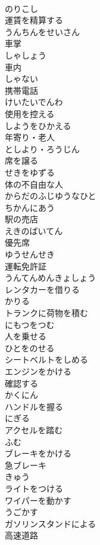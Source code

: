 \documentclass[8pt]{extreport}
\begin{document}
\begin{CJK}{UTF8}{min}
\\	のりこし
\\	運賃を精算する	
\\	うんちんをせいさん
\\	車掌	
\\	しゃしょう
\\	車内	
\\	しゃない
\\	携帯電話	
\\	けいたいでんわ
\\	使用を控える	
\\	しようをひかえる
\\	年寄り・老人	
\\	としより・ろうじん
\\	席を譲る	
\\	せきをゆずる
\\	体の不自由な人	
\\	からだのふじゆうなひと
\\	ちかんにあう	
\\	駅の売店	
\\	えきのばいてん
\\	優先席	
\\	ゆうせんせき
\\	運転免許証	
\\	うんてんめんきょしょう
\\	レンタカーを借りる	
\\	かりる
\\	トランクに荷物を積む	
\\	にもつをつむ
\\	人を乗せる	
\\	ひとをのせる
\\	シートベルトをしめる	
\\	エンジンをかける	
\\	確認する	
\\	かくにん
\\	ハンドルを握る	
\\	にぎる
\\	アクセルを踏む	
\\	ふむ
\\	ブレーキをかける	
\\	急ブレーキ	
\\	きゅう
\\	ライトをつける	
\\	ワイパーを動かす	
\\	うごかす
\\	ガソリンスタンドによる	
\\	高速道路	

\end{CJK}
\end{document}
